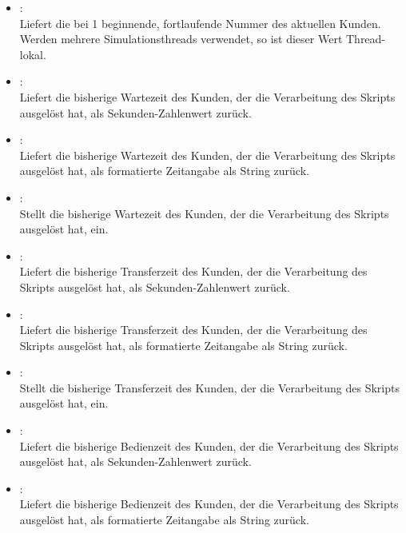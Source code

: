 \begin{itemize}
\item
{}:\\
Liefert die bei 1 beginnende, fortlaufende Nummer des aktuellen Kunden.
Werden mehrere Simulationsthreads verwendet, so ist dieser Wert Thread-lokal.
  
\item
{}:\\
Liefert die bisherige Wartezeit des Kunden, der die Verarbeitung des Skripts ausgelöst hat, als Sekunden-Zahlenwert zurück.
  
\item
{}:\\
Liefert die bisherige Wartezeit des Kunden, der die Verarbeitung des Skripts ausgelöst hat, als formatierte Zeitangabe als String zurück.
  
\item
{}:\\
Stellt die bisherige Wartezeit des Kunden, der die Verarbeitung des Skripts ausgelöst hat, ein.
  
\item
{}:\\
Liefert die bisherige Transferzeit des Kunden, der die Verarbeitung des Skripts ausgelöst hat, als Sekunden-Zahlenwert zurück.
  
\item
{}:\\
Liefert die bisherige Transferzeit des Kunden, der die Verarbeitung des Skripts ausgelöst hat, als formatierte Zeitangabe als String zurück.
  
\item
{}:\\
Stellt die bisherige Transferzeit des Kunden, der die Verarbeitung des Skripts ausgelöst hat, ein.
  
\item
{}:\\
Liefert die bisherige Bedienzeit des Kunden, der die Verarbeitung des Skripts ausgelöst hat, als Sekunden-Zahlenwert zurück.
  
\item
{}:\\
Liefert die bisherige Bedienzeit des Kunden, der die Verarbeitung des Skripts ausgelöst hat, als formatierte Zeitangabe als String zurück.
  

\end{itemize}
